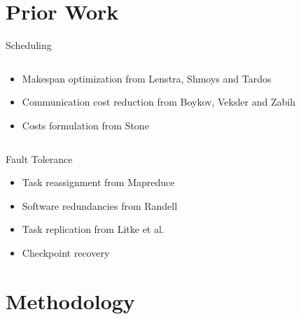\documentclass{beamer}
\begin{document}
\section{Prior Work}

\begin{frame}{Scheduling}
\begin{columns}
\begin{column}{6cm}
\begin{itemize}
	\item Makespan optimization from Lenstra, Shmoys and Tardos \cite{len87}
	\item Communication cost reduction from Boykov, Veksler and Zabih \cite{boy01}
	\item Costs formulation from Stone \cite{sto77}
\end{itemize}
\end{column}
\begin{column}{4cm}
\end{column}
\end{columns}
\end{frame}

\begin{frame}{Fault Tolerance}
\begin{itemize}
	\item Task reassignment from Mapreduce \cite{dea08}
	\item Software redundancies from Randell \cite{ran75}
	\item Task replication from Litke et al. \cite{lit07}
	\item Checkpoint recovery \cite{ree06}
\end{itemize}
\end{frame}

\section{Methodology}
\end{document}
